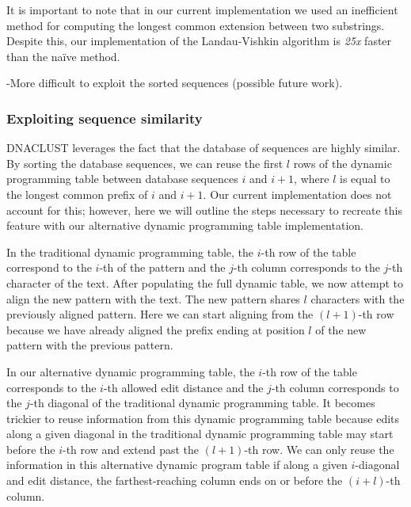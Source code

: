 It is important to note that in our current implementation we used an inefficient method for computing the longest common extension between two substrings.
Despite this, our implementation of the Landau-Vishkin algorithm is \emph{25x} faster than the na\"ive method.

-More difficult to exploit the sorted sequences (possible future work).
\subsubsection{Exploiting sequence similarity}
DNACLUST leverages the fact that the database of sequences are highly similar.
By sorting the database sequences, we can reuse the first $l$ rows of the dynamic programming table between database sequences $i$ and $i+1$, where $l$ is equal to the longest common prefix of $i$ and $i+1$.
Our current implementation does not account for this; however, here we will outline the steps necessary to recreate this feature with our alternative dynamic programming table implementation.

In the traditional dynamic programming table, the $i$-th row of the table correspond to the $i$-th of the pattern and the $j$-th column corresponds to the $j$-th character of the text.
After populating the full dynamic table, we now attempt to align the new pattern with the text.
The new pattern shares $l$ characters with the previously aligned pattern.
Here we can start aligning from the $(l+1)$-th row because we have already aligned the prefix ending at position $l$ of the new pattern with the previous pattern.

In our alternative dynamic programming table, the $i$-th row of the table corresponds to the $i$-th allowed edit distance and the $j$-th column corresponds to the $j$-th diagonal of the traditional dynamic programming table.
It becomes trickier to reuse information from this dynamic programming table because edits along a given diagonal in the traditional dynamic programming table may start before the $i$-th row and extend past the $(l+1)$-th row.
We can only reuse the information in this alternative dynamic program table if along a given $i$-diagonal and edit distance, the farthest-reaching column ends on or before the $(i+l)$-th column.

